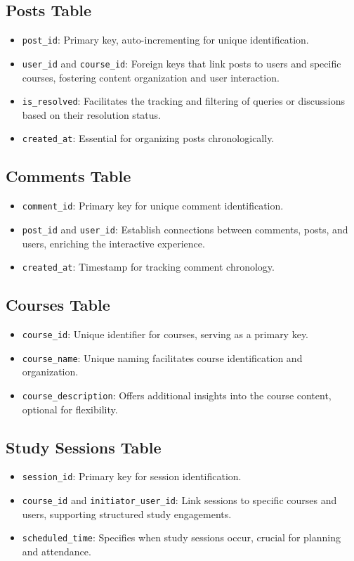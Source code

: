 \documentclass[12pt]{article} %
\begin{document}
\subsection*{Posts Table}
\begin{itemize}
    \item \texttt{post\_id}: Primary key, auto-incrementing for unique identification.
    \item \texttt{user\_id} and \texttt{course\_id}: Foreign keys that link posts to users and specific courses, fostering content organization and user interaction.
    \item \texttt{is\_resolved}: Facilitates the tracking and filtering of queries or discussions based on their resolution status.
    \item \texttt{created\_at}: Essential for organizing posts chronologically.
\end{itemize}

\subsection*{Comments Table}
\begin{itemize}
    \item \texttt{comment\_id}: Primary key for unique comment identification.
    \item \texttt{post\_id} and \texttt{user\_id}: Establish connections between comments, posts, and users, enriching the interactive experience.
    \item \texttt{created\_at}: Timestamp for tracking comment chronology.
\end{itemize}

\subsection*{Courses Table}
\begin{itemize}
    \item \texttt{course\_id}: Unique identifier for courses, serving as a primary key.
    \item \texttt{course\_name}: Unique naming facilitates course identification and organization.
    \item \texttt{course\_description}: Offers additional insights into the course content, optional for flexibility.
\end{itemize}

\subsection*{Study Sessions Table}
\begin{itemize}
    \item \texttt{session\_id}: Primary key for session identification.
    \item \texttt{course\_id} and \texttt{initiator\_user\_id}: Link sessions to specific courses and users, supporting structured study engagements.
    \item \texttt{scheduled\_time}: Specifies when study sessions occur, crucial for planning and attendance.
\end{itemize}
\end{document}
